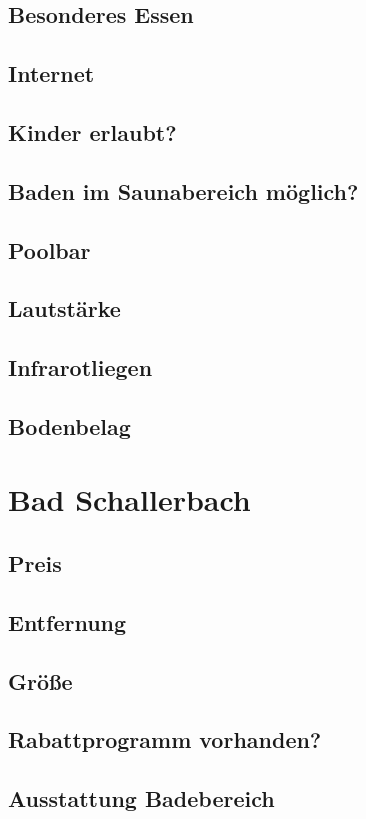 \documentclass{article}
\begin{document}
\subsection*{Besonderes Essen}
\subsection*{Internet}
\subsection*{Kinder erlaubt?}
\subsection*{Baden im Saunabereich möglich?}
\subsection*{Poolbar}
\subsection*{Lautstärke}
\subsection*{Infrarotliegen}
\subsection*{Bodenbelag}
\pagebreak

\section*{Bad Schallerbach}
\subsection*{Preis}
\subsection*{Entfernung}
\subsection*{Größe}
\subsection*{Rabattprogramm vorhanden?}
\subsection*{Ausstattung Badebereich}
\end{document}
